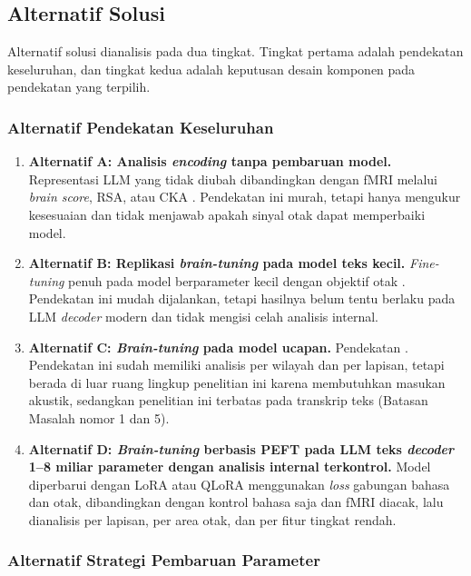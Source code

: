   \subsection{Alternatif Solusi}
  \label{sub:am_alternatif}

  Alternatif solusi dianalisis pada dua tingkat. Tingkat pertama adalah pendekatan keseluruhan, dan tingkat kedua adalah keputusan desain komponen pada pendekatan yang terpilih.

  \subsubsection{Alternatif Pendekatan Keseluruhan}

  \begin{enumerate}
      \item \textbf{Alternatif A: Analisis \textit{encoding} tanpa pembaruan model.} Representasi LLM yang tidak diubah dibandingkan dengan fMRI melalui \textit{brain score}, RSA, atau CKA \autocite{schrimpf2021neural, mischler2024contextual, yu2024predicting}. Pendekatan ini murah, tetapi hanya mengukur kesesuaian dan tidak menjawab apakah sinyal otak dapat memperbaiki model.
      \item \textbf{Alternatif B: Replikasi \textit{brain-tuning} pada model teks kecil.} \textit{Fine-tuning} penuh pada model berparameter kecil dengan objektif otak \autocite{schwartz2019inducing, negi2025brain}. Pendekatan ini mudah dijalankan, tetapi hasilnya belum tentu berlaku pada LLM \textit{decoder} modern dan tidak mengisi celah analisis internal.
      \item \textbf{Alternatif C: \textit{Brain-tuning} pada model ucapan.} Pendekatan \textcite{moussa2025improving, moussa2026generalizability}. Pendekatan ini sudah memiliki analisis per wilayah dan per lapisan, tetapi berada di luar ruang lingkup penelitian ini karena membutuhkan masukan akustik, sedangkan penelitian ini terbatas pada transkrip teks (Batasan Masalah nomor 1 dan 5).
      \item \textbf{Alternatif D: \textit{Brain-tuning} berbasis PEFT pada LLM teks \textit{decoder} 1--8 miliar parameter dengan analisis internal terkontrol.} Model diperbarui dengan LoRA atau QLoRA menggunakan \textit{loss} gabungan bahasa dan otak, dibandingkan dengan kontrol bahasa saja dan fMRI diacak, lalu dianalisis per lapisan, per area otak, dan per fitur tingkat rendah.
  \end{enumerate}

  \subsubsection{Alternatif Strategi Pembaruan Parameter}

